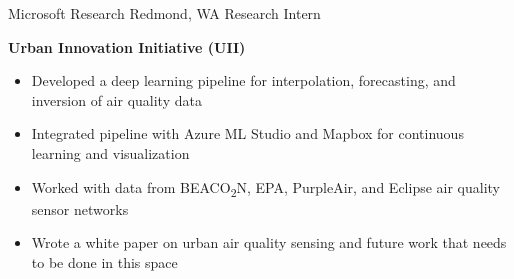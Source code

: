 
        {Microsoft Research}
        {Redmond, WA}
        {Research Intern}
        {}{
    \textbf{Urban Innovation Initiative (UII)}
    \begin{itemize}
        \item Developed a deep learning pipeline for interpolation, forecasting, and inversion of air quality data
        \item Integrated pipeline with Azure ML Studio and Mapbox for continuous learning and visualization
        \item Worked with data from BEACO\textsubscript{2}N, EPA, PurpleAir, and Eclipse air quality sensor networks
        \item Wrote a white paper on urban air quality sensing and future work that needs to be done in this space
    \end{itemize}
}
